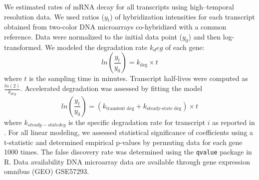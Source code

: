 We estimated rates of
mRNA decay for all transcripts using high–temporal resolution data. We
used ratios ($y_t$) of hybridization intensities for each transcript
obtained from two-color DNA microarrays co-hybridized with a common
reference. Data were normalized to the initial data point ($y_0$) and
then log-transformed. We modeled the degradation rate $k_deg$ of each
gene:
$$ ln\left(\frac{y_t}{y_0}\right)=k_{\text{deg}}\times t$$
where $t$ is the sampling time in minutes. Transcript
half-lives were computed as $\frac{ln(2)}{k_{deg}}$. 
Accelerated degradation was
assessed by fitting the model 
$$ ln\left(\frac{y_t}{y_0}\right)=(k_{\text{transient
deg}}+k_{\text{steady-state deg}})\times t$$
where $k_{steady-state deg}$ 
is the specific degradation rate for transcript $i$ as reported in 
\cite{neymotin2014determination}.
For all linear modeling, we assessed statistical
significance of coefficients using a t-statistic and determined
empirical p-values by permuting data for each gene 1000 times. The
false discovery rate was determined using the \texttt{qvalue} package in R.
Data availability DNA microarray data are available through gene
expression omnibus (GEO) GSE57293.

